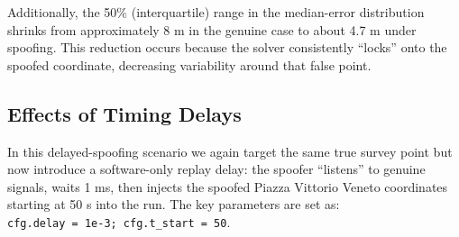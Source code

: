         \noindent Additionally, the 50\% (interquartile) range in the median-error distribution shrinks from approximately 8 m in the genuine case to about 4.7 m under spoofing. 
        This reduction occurs because the solver consistently “locks” onto the spoofed coordinate, decreasing variability around that false point.

    \subsection{Effects of Timing Delays}

        In this delayed-spoofing scenario we again target the same true survey point but now introduce a software-only replay delay: the spoofer “listens” to genuine signals, waits 1 ms, then injects the spoofed Piazza Vittorio Veneto coordinates starting at 50 s into the run. 
        The key parameters are set as: \\ 
        \texttt{cfg.delay = 1e-3; cfg.t\_start = 50}.

